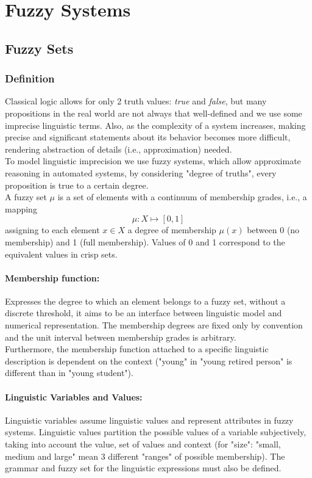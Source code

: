 \section{Fuzzy Systems}

\subsection{Fuzzy Sets}

\subsubsection{Definition}
Classical logic allows for only 2 truth values: \textit{true} and \textit{false}, but  many propositions in the real world are not always that well-defined and we use some imprecise linguistic terms. Also, as the complexity of a system increases, making precise and significant statements about its behavior becomes more difficult, rendering abstraction of details (i.e., approximation) needed.\\

To model linguistic imprecision we use fuzzy systems, which allow approximate reasoning in automated systems, by considering "degree of truths", every proposition is true to a certain degree.\\

A fuzzy set $\mu$ is a set of elements with a continuum of membership grades, i.e., a mapping
$$ \mu: X \mapsto [0,1] $$
assigning to each element $x \in X$ a degree of membership $\mu(x)$ between 0 (no membership) and 1 (full membership). Values of 0 and 1 correspond to the equivalent values in crisp sets.\\

\paragraph{Membership function:} Expresses the degree to which an element belongs to a fuzzy set, without a discrete threshold, it aims to be an interface between linguistic model and numerical representation. The membership degrees are fixed only by convention and the unit interval between membership grades is arbitrary.\\
Furthermore, the membership function attached to a specific linguistic description is dependent on the context ("young" in "young retired person" is different than in "young student").\\

\paragraph{Linguistic Variables and Values:} Linguistic variables assume linguistic values and represent attributes in fuzzy systems. Linguistic values partition the possible values of  a variable subjectively, taking into account the value, set of values and context (for "size": "small, medium and large" mean 3 different "ranges" of possible membership). The grammar and fuzzy set for the linguistic expressions must also be defined.\\

